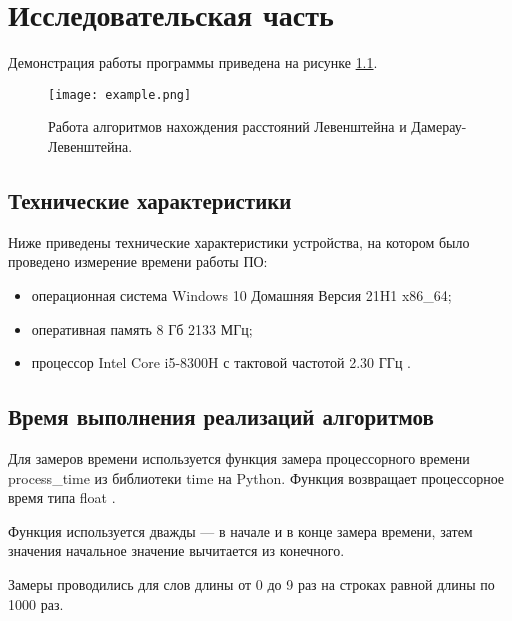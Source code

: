 \chapter{Исследовательская часть}

	Демонстрация работы программы приведена на рисунке \ref{img:primer}.
\begin{figure}[h]
	\begin{center}
		\texttt{[image: example.png]}
		\caption{Работа алгоритмов нахождения расстояний Левенштейна и Дамерау-Левенштейна.}
		\centering
		\label{img:primer}
	\end{center}
\end{figure}

\section{Технические характеристики}

Ниже приведены технические характеристики устройства, на котором было проведено измерение времени работы ПО:

\begin{itemize}
	\item операционная система Windows 10 Домашняя Версия 21H1 \cite{windows} x86\_64;
	\item оперативная память 8 Гб 2133 МГц;
	\item процессор Intel Core i5-8300H с тактовой частотой 2.30 ГГц \cite{intel}.
\end{itemize}

\section{Время выполнения реализаций алгоритмов}

Для замеров времени используется функция замера процессорного времени process\_time из библиотеки time на Python. Функция возвращает процессорное время типа float \cite{time}.

Функция используется дважды --- в начале и в конце замера времени, затем значения начальное значение вычитается из конечного.

Замеры проводились для слов длины от 0 до 9 раз на строках равной длины по 1000 раз. 

